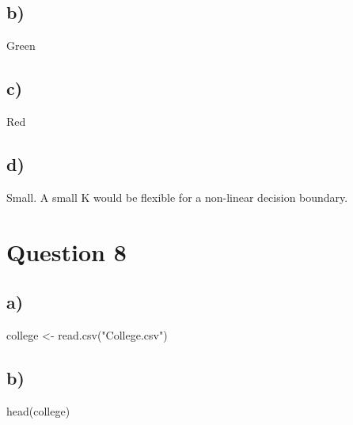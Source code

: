 \documentclass[
]{article}
\newenvironment{Shaded}{\begin{snugshade}}{\end{snugshade}}
\newcommand{\FunctionTok}[1]{\textcolor[rgb]{0.00,0.00,0.00}{#1}}
\newcommand{\NormalTok}[1]{#1}
\newcommand{\OtherTok}[1]{\textcolor[rgb]{0.56,0.35,0.01}{#1}}
\newcommand{\StringTok}[1]{\textcolor[rgb]{0.31,0.60,0.02}{#1}}
\begin{document}
\hypertarget{b-4}{%
\subsection{b)}\label{b-4}}

Green

\hypertarget{c-3}{%
\subsection{c)}\label{c-3}}

Red

\hypertarget{d-1}{%
\subsection{d)}\label{d-1}}

Small. A small K would be flexible for a non-linear decision boundary.

\hypertarget{question-8}{%
\section{Question 8}\label{question-8}}

\hypertarget{a-5}{%
\subsection{a)}\label{a-5}}

\begin{Shaded}
\begin{Highlighting}[]
\NormalTok{college }\OtherTok{\textless{}{-}} \FunctionTok{read.csv}\NormalTok{(}\StringTok{"College.csv"}\NormalTok{)}
\end{Highlighting}
\end{Shaded}

\hypertarget{b-5}{%
\subsection{b)}\label{b-5}}

\begin{Shaded}
\begin{Highlighting}[]
\FunctionTok{head}\NormalTok{(college)}
\end{Highlighting}
\end{Shaded}
\end{document}
